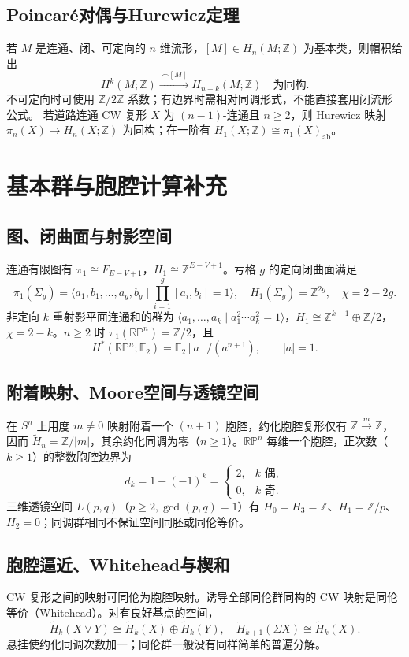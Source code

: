 \documentclass[../main.tex]{subfiles}
\begin{document}
\subsection{Poincaré对偶与Hurewicz定理}
若 $M$ 是连通、闭、可定向的 $n$ 维流形，$[M]\in H_n(M;\mathbb Z)$ 为基本类，则帽积给出
\[
H^k(M;\mathbb Z)\xrightarrow{\ \frown[M]\ }H_{n-k}(M;\mathbb Z)
\quad\text{为同构}.
\]
不可定向时可使用 $\mathbb Z/2\mathbb Z$ 系数；有边界时需相对同调形式，不能直接套用闭流形公式。
若道路连通 CW 复形 $X$ 为 $(n-1)$-连通且 $n\ge2$，则 Hurewicz 映射 $\pi_n(X)\to H_n(X;\mathbb Z)$ 为同构；在一阶有 $H_1(X;\mathbb Z)\cong\pi_1(X)_{\mathrm{ab}}$。
\section{基本群与胞腔计算补充}
\subsection{图、闭曲面与射影空间}
连通有限图有 $\pi_1\cong F_{E-V+1}$，$H_1\cong\mathbb Z^{E-V+1}$。亏格 $g$ 的定向闭曲面满足
\[
\pi_1(\Sigma_g)=\langle a_1,b_1,\ldots,a_g,b_g\mid\prod_{i=1}^g[a_i,b_i]=1\rangle,
\quad H_1(\Sigma_g)=\mathbb Z^{2g},\quad\chi=2-2g.
\]
非定向 $k$ 重射影平面连通和的群为 $\langle a_1,\ldots,a_k\mid a_1^2\cdots a_k^2=1\rangle$，$H_1\cong\mathbb Z^{k-1}\oplus\mathbb Z/2$，$\chi=2-k$。$n\ge2$ 时 $\pi_1(\mathbb{RP}^n)=\mathbb Z/2$，且
\[
H^*(\mathbb{RP}^n;\mathbb F_2)=\mathbb F_2[a]/(a^{n+1}),\qquad |a|=1.
\]
\subsection{附着映射、Moore空间与透镜空间}
在 $S^n$ 上用度 $m\ne0$ 映射附着一个 $(n+1)$ 胞腔，约化胞腔复形仅有 $\mathbb Z\xrightarrow{m}\mathbb Z$，因而 $\widetilde H_n=\mathbb Z/|m|$，其余约化同调为零（$n\ge1$）。$\mathbb{RP}^n$ 每维一个胞腔，正次数（$k\ge1$）的整数胞腔边界为
\[
d_k=1+(-1)^k=\begin{cases}2,&k\text{ 偶},\\0,&k\text{ 奇}.\end{cases}
\]
三维透镜空间 $L(p,q)$（$p\ge2,\gcd(p,q)=1$）有 $H_0=H_3=\mathbb Z$、$H_1=\mathbb Z/p$、$H_2=0$；同调群相同不保证空间同胚或同伦等价。
\subsection{胞腔逼近、Whitehead与楔和}
CW 复形之间的映射可同伦为胞腔映射。诱导全部同伦群同构的 CW 映射是同伦等价（Whitehead）。对有良好基点的空间，
\[
\widetilde H_k(X\vee Y)\cong\widetilde H_k(X)\oplus\widetilde H_k(Y),\quad
\widetilde H_{k+1}(\Sigma X)\cong\widetilde H_k(X).
\]
悬挂使约化同调次数加一；同伦群一般没有同样简单的普遍分解。
\end{document}
